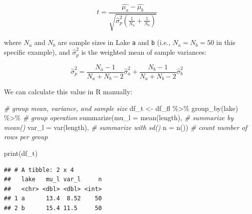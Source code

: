 \documentclass[
]{article}
\newenvironment{Shaded}{\begin{snugshade}}{\end{snugshade}}
\newcommand{\AttributeTok}[1]{\textcolor[rgb]{0.77,0.63,0.00}{#1}}
\newcommand{\CommentTok}[1]{\textcolor[rgb]{0.56,0.35,0.01}{\textit{#1}}}
\newcommand{\FunctionTok}[1]{\textcolor[rgb]{0.00,0.00,0.00}{#1}}
\newcommand{\NormalTok}[1]{#1}
\newcommand{\OtherTok}[1]{\textcolor[rgb]{0.56,0.35,0.01}{#1}}
\newcommand{\SpecialCharTok}[1]{\textcolor[rgb]{0.00,0.00,0.00}{#1}}
\begin{document}
\[
t = \frac{\hat{\mu_a} - \hat{\mu_b}}{\sqrt{\hat{\sigma}^2_p \left(\frac{1}{N_a} + \frac{1}{N_b}\right)}}
\]

where \(N_a\) and \(N_b\) are sample sizes in Lake \texttt{a} and \texttt{b} (i.e., \(N_a = N_b = 50\) in this specific example), and \(\hat{\sigma}^2_p\) is the weighted mean of sample variances:

\[
\hat{\sigma}^2_p = \frac{N_a-1}{N_a + N_b - 2}\hat{\sigma}^2_a + \frac{N_b-1}{N_a + N_b - 2}\hat{\sigma}^2_b
\]

We can calculate this value in R manually:

\begin{Shaded}
\begin{Highlighting}[]
\CommentTok{\# group mean, variance, and sample size}
\NormalTok{df\_t }\OtherTok{\textless{}{-}}\NormalTok{ df\_fl }\SpecialCharTok{\%\textgreater{}\%} 
  \FunctionTok{group\_by}\NormalTok{(lake) }\SpecialCharTok{\%\textgreater{}\%} \CommentTok{\# group operation}
  \FunctionTok{summarize}\NormalTok{(}\AttributeTok{mu\_l =} \FunctionTok{mean}\NormalTok{(length), }\CommentTok{\# summarize by mean()}
            \AttributeTok{var\_l =} \FunctionTok{var}\NormalTok{(length), }\CommentTok{\# summarize with sd()}
            \AttributeTok{n =} \FunctionTok{n}\NormalTok{()) }\CommentTok{\# count number of rows per group}

\FunctionTok{print}\NormalTok{(df\_t)}
\end{Highlighting}
\end{Shaded}

\begin{verbatim}
## # A tibble: 2 x 4
##   lake   mu_l var_l     n
##   <chr> <dbl> <dbl> <int>
## 1 a      13.4  8.52    50
## 2 b      15.4 11.5     50
\end{verbatim}
\end{document}
